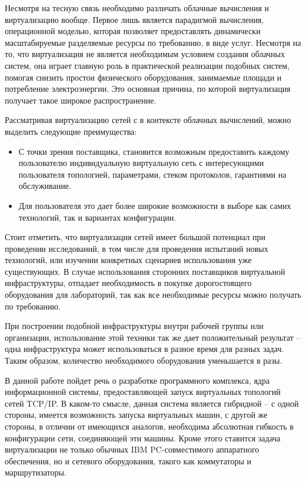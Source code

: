 Несмотря на тесную связь необходимо различать облачные вычисления и виртуализацию вообще. 
Первое лишь является парадигмой вычисления, операционной моделью, которая позволяет
предоставлять динамически масштабируемые разделяемые ресурсы по требованию, в виде услуг.
Несмотря на то, что виртуализация не является необходимым условием создания облачных
систем, она играет главную роль в практической реализации подобных систем, помогая
снизить простои физического оборудования, занимаемые площади и потребление
электроэнергии. Это основная причина, по которой виртуализация получает такое широкое 
распространение.
\cite{Kamoun:2009:VDW:1595422.1595424}

Рассматривая виртуализацию сетей с в контексте облачных вычислений, можно выделить следующие преимущества:
\begin{itemize}
    \item С точки зрения поставщика, становится возможным предоставить
    каждому пользователю индивидуальную виртуальную сеть с интересующими пользователя     
    топологией, параметрами, стеком протоколов, гарантиями на обслуживание.
    \item Для пользователя это дает более широкие возможности в выборе как самих технологий,
    так и вариантах конфигурации.
\end{itemize}

Стоит отметить, что виртуализация сетей имеет большой потенциал при проведении 
исследований, в том числе для проведения испытаний новых технологий, или изучении
конкретных сценариев использования уже существующих. В случае использования
сторонних поставщиков виртуальной инфраструктуры, отпадает необходимость в покупке
дорогостоящего оборудования для лабораторий, так как все необходимые ресурсы можно
получать по требованию.

При построении подобной инфраструктуры внутри рабочей группы или организации, 
использование этой техники так же дает положительный результат -- одна инфраструктура
может использоваться в разное время для разных задач. Таким образом, количество
необходимого оборудования уменьшается в разы.

В данной работе пойдет речь о разработке программного комплекса, ядра информационной 
системы, предоставляющей запуск виртуальных топологий сетей TCP/IP. 
В каком-то смысле, данная система
является гибридной -- с одной стороны, имеется возможность запуска виртуальных машин,
с другой же стороны, в отличии от имеющихся аналогов, необходима абсолютная гибкость
в конфигурации сети, соединяющей эти машины. Кроме этого ставится задача виртуализации
не только обычных IBM PC-совместимого аппаратного обеспечения, но и сетевого оборудования,
такого как коммутаторы и маршрутизаторы.

